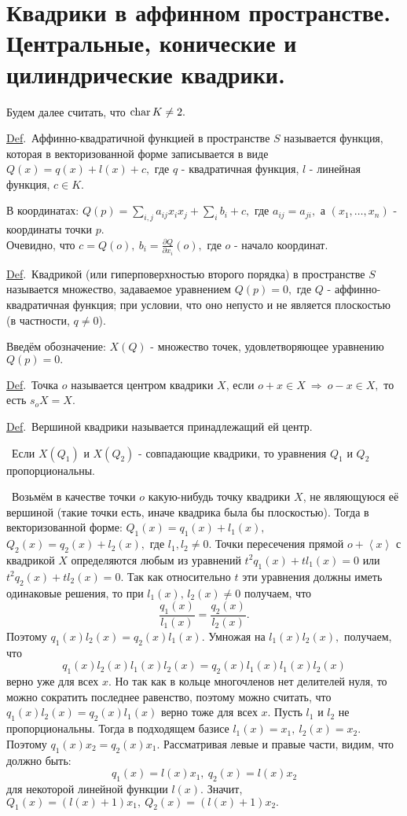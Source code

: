 \documentclass[draft]{article}%
\newcommand{\de}{\par\noindent\underline{Def}.\ }%
\newcommand{\ab}{\par\noindent}%
\newcommand{\te}{\par\noindent{\bf Теорема.}\ }%
\newcommand{\dok}{\par\noindent{\textsl{Доказательство}.}\ }%
\newcommand{\lob}[1]{\left\langle#1\right\rangle}%
\newcommand{\rom}[1]{{\rm#1\,}}
\begin{document}
\section{Квадрики в аффинном пространстве.\\ Центральные, конические и цилиндрические квадрики.}
\label{q44}
Будем далее считать, что $\rom{char}K\ne 2.$
\de Аффинно-квадратичной функцией в пространстве $S$ называется функция, которая в векторизованной форме записывается
в виде $Q(x)=q(x)+l(x)+c,$ где $q$ - квадратичная функция, $l$ - линейная функция, $c\in K.$
\ab В координатах: $Q(p)=\sum\limits_{i,j}a_{ij}x_ix_j+\sum\limits_ib_i+c,$ где $a_{ij}=a_{ji},$ а $(x_1,\dots,x_n)$ -
координаты точки $p$.\\ Очевидно, что $c=Q(o),\ b_i=\frac{\displaystyle \partial Q}{\displaystyle \partial x_i}(o),$ где $o$ -
начало координат.
\de Квадрикой (или гиперповерхностью второго порядка) в пространстве $S$ называется множество, задаваемое уравнением $Q(p)=0,$
где $Q$ - аффинно-квадратичная функция; при условии, что оно непусто и не является плоскостью
(в частности, $q\ne 0$).
\ab Введём обозначение: $X(Q)$ - множество точек, удовлетворяющее уравнению $Q(p)=0.$
\de Точка $o$ называется центром квадрики $X$, если $o+x\in X\ \Rightarrow\ o-x\in X,$ то есть $s_oX=X.$
\de Вершиной квадрики называется принадлежащий ей центр.
\te Если $X(Q_1)$ и $X(Q_2)$ - совпадающие квадрики, то уравнения $Q_1$ и $Q_2$ пропорциональны.
\dok Возьмём в качестве точки $o$ какую-нибудь точку квадрики $X$, не являющуюся её вершиной (такие точки есть, иначе
квадрика была бы плоскостью). Тогда в
векторизованной форме: $Q_1(x)=q_1(x)+l_1(x),$\ \  $Q_2(x)=q_2(x)+l_2(x),$ где $l_1,l_2\ne 0.$ Точки пересечения прямой $o+\lob{x}$
с квадрикой $X$ определяются любым из уравнений $t^2q_1(x)+tl_1(x)=0$ или $t^2q_2(x)+tl_2(x)=0.$ Так как относительно $t$
эти уравнения должны иметь одинаковые решения, то при $l_1(x),\,l_2(x)\ne 0$ получаем, что
$$
\frac{q_1(x)}{l_1(x)}=\frac{q_2(x)}{l_2(x)}.
$$
Поэтому $q_1(x)l_2(x)=q_2(x)l_1(x).$ Умножая на $l_1(x)l_2(x),$ получаем, что $$q_1(x)l_2(x)l_1(x)l_2(x)=q_2(x)l_1(x)l_1(x)l_2(x)$$
верно уже для всех $x$.
Но так как в кольце многочленов нет делителей нуля, то можно сократить последнее равенство, поэтому можно считать, что
$q_1(x)l_2(x)=q_2(x)l_1(x)$ верно тоже для всех $x$. Пусть $l_1$ и $l_2$ не пропорциональны. Тогда в подходящем базисе
$l_1(x)=x_1,\ l_2(x)=x_2.$ Поэтому $q_1(x)x_2=q_2(x)x_1.$ Рассматривая левые и правые части, видим, что должно быть:
$$q_1(x)=l(x)x_1,\ q_2(x)=l(x)x_2$$ для некоторой линейной функции $l(x).$ Значит, $Q_1(x)=(l(x)+1)x_1,\ Q_2(x)=(l(x)+1)x_2.$
\end{document}
